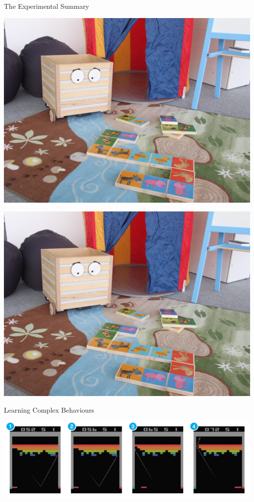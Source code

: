 \documentclass[compress]{beamer}
\begin{document}
{\begin{frame}{The Experimental Summary}
\begin{multicols}{4}
        \includegraphics[width=\columnwidth]{ranger-background}

        \includegraphics[width=\columnwidth]{ranger-background}
    \end{multicols}


\end{frame}

{
\begin{frame}{Learning Complex Behaviours}

    \begin{center}
        \includegraphics[width=\linewidth]{breakout}
    \end{center}



\end{frame}}}
\end{document}
